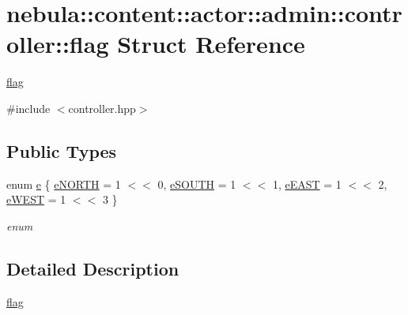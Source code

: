 \hypertarget{structnebula_1_1content_1_1actor_1_1admin_1_1controller_1_1flag}{
\section{nebula::content::actor::admin::controller::flag Struct Reference}
\label{structnebula_1_1content_1_1actor_1_1admin_1_1controller_1_1flag}
}


\hyperlink{structnebula_1_1content_1_1actor_1_1admin_1_1controller_1_1flag}{flag}  


{\ttfamily \#include $<$controller.hpp$>$}\subsection*{Public Types}
\begin{DoxyCompactItemize}
\item 
enum \hyperlink{structnebula_1_1content_1_1actor_1_1admin_1_1controller_1_1flag_a18087a2b47a128a6330ee8c97d11f306}{e} \{ \hyperlink{structnebula_1_1content_1_1actor_1_1admin_1_1controller_1_1flag_a18087a2b47a128a6330ee8c97d11f306a1163ec537e9f2facc4e408c338282526}{eNORTH} =  1 $<$$<$ 0, 
\hyperlink{structnebula_1_1content_1_1actor_1_1admin_1_1controller_1_1flag_a18087a2b47a128a6330ee8c97d11f306ab7e37dd2a955865b5af79585a7e7134e}{eSOUTH} =  1 $<$$<$ 1, 
\hyperlink{structnebula_1_1content_1_1actor_1_1admin_1_1controller_1_1flag_a18087a2b47a128a6330ee8c97d11f306a24379d161e8e3e937dbf30e849fcbbab}{eEAST} =  1 $<$$<$ 2, 
\hyperlink{structnebula_1_1content_1_1actor_1_1admin_1_1controller_1_1flag_a18087a2b47a128a6330ee8c97d11f306a4739265224b1e9959bd94ac128740742}{eWEST} =  1 $<$$<$ 3
 \}
\begin{DoxyCompactList}\small\item\em enum \item\end{DoxyCompactList}\end{DoxyCompactItemize}


\subsection{Detailed Description}
\hyperlink{structnebula_1_1content_1_1actor_1_1admin_1_1controller_1_1flag}{flag} 

